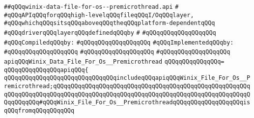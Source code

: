 \label{src/lib/std/src/io/winix-data-file-for-os--premicrothread.api}
\verb|##qQQqwinix-data-file-for-os--premicrothread.api|\newline
\verb|#|\newline
\verb|#qQQqAPIqQQqforqQQqhigh-levelqQQqfileqQQqI/OqQQqlayer,|\newline
\verb|#qQQqwhichqQQqsitsqQQqaboveqQQqtheqQQqplatform-dependentqQQq|\newline
\verb|#qQQqdriverqQQqlayerqQQqdefinedqQQqby|\newline
\verb|#|\newline
\verb|#qQQqqQQqqQQqqQQqqQQq|\newline
\newline
\verb|#qQQqCompiledqQQqby:|\newline
\verb|#qQQqqQQqqQQqqQQqqQQq|\newline
\newline
\verb|#qQQqImplementedqQQqby:|\newline
\verb|#qQQqqQQqqQQqqQQqqQQq|\newline
\verb|#qQQqqQQqqQQqqQQqqQQq|\newline
\verb|#qQQqqQQqqQQqqQQqqQQq|\newline
\newline
\verb|apiqQQqWinix_Data_File_For_Os__Premicrothread|\newline
\verb|qQQqqQQqqQQqqQQq=|\newline
\verb|qQQqqQQqqQQqqQQqapiqQQq{|\newline
\verb|qQQqqQQqqQQqqQQqqQQqqQQqqQQqqQQqincludeqQQqapiqQQqWinix_File_For_Os__Premicrothread;qQQqqQQqqQQqqQQqqQQqqQQqqQQqqQQqqQQqqQQqqQQqqQQqqQQqqQQqqQQqqQQqqQQqqQQqqQQqqQQqqQQqqQQqqQQqqQQqqQQqqQQqqQQqqQQqqQQqqQQqqQQqqQQqqQQqqQQq#qQQqWinix_File_For_Os__PremicrothreadqQQqqQQqqQQqqQQqqQQqisqQQqfromqQQqqQQqqQQq|\newline
